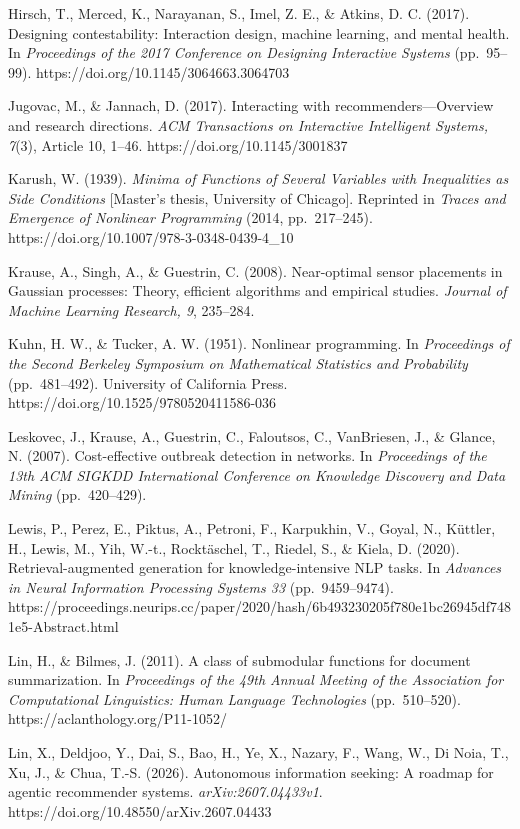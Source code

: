 \documentclass[
  11pt]{article}
\begin{document}
Hirsch, T., Merced, K., Narayanan, S., Imel, Z. E., \& Atkins, D. C.
(2017). Designing contestability: Interaction design, machine learning,
and mental health. In \emph{Proceedings of the 2017 Conference on
Designing Interactive Systems} (pp.~95--99).
https://doi.org/10.1145/3064663.3064703

Jugovac, M., \& Jannach, D. (2017). Interacting with
recommenders---Overview and research directions. \emph{ACM Transactions
on Interactive Intelligent Systems, 7}(3), Article 10, 1--46.
https://doi.org/10.1145/3001837

Karush, W. (1939). \emph{Minima of Functions of Several Variables with
Inequalities as Side Conditions} {[}Master's thesis, University of
Chicago{]}. Reprinted in \emph{Traces and Emergence of Nonlinear
Programming} (2014, pp.~217--245).
https://doi.org/10.1007/978-3-0348-0439-4\_10

Krause, A., Singh, A., \& Guestrin, C. (2008). Near-optimal sensor
placements in Gaussian processes: Theory, efficient algorithms and
empirical studies. \emph{Journal of Machine Learning Research, 9},
235--284.

Kuhn, H. W., \& Tucker, A. W. (1951). Nonlinear programming. In
\emph{Proceedings of the Second Berkeley Symposium on Mathematical
Statistics and Probability} (pp.~481--492). University of California
Press. https://doi.org/10.1525/9780520411586-036

Leskovec, J., Krause, A., Guestrin, C., Faloutsos, C., VanBriesen, J.,
\& Glance, N. (2007). Cost-effective outbreak detection in networks. In
\emph{Proceedings of the 13th ACM SIGKDD International Conference on
Knowledge Discovery and Data Mining} (pp.~420--429).

Lewis, P., Perez, E., Piktus, A., Petroni, F., Karpukhin, V., Goyal, N.,
Küttler, H., Lewis, M., Yih, W.-t., Rocktäschel, T., Riedel, S., \&
Kiela, D. (2020). Retrieval-augmented generation for knowledge-intensive
NLP tasks. In \emph{Advances in Neural Information Processing Systems
33} (pp.~9459--9474).
https://proceedings.neurips.cc/paper/2020/hash/6b493230205f780e1bc26945df7481e5-Abstract.html

Lin, H., \& Bilmes, J. (2011). A class of submodular functions for
document summarization. In \emph{Proceedings of the 49th Annual Meeting
of the Association for Computational Linguistics: Human Language
Technologies} (pp.~510--520). https://aclanthology.org/P11-1052/

Lin, X., Deldjoo, Y., Dai, S., Bao, H., Ye, X., Nazary, F., Wang, W., Di
Noia, T., Xu, J., \& Chua, T.-S. (2026). Autonomous information seeking:
A roadmap for agentic recommender systems. \emph{arXiv:2607.04433v1}.
https://doi.org/10.48550/arXiv.2607.04433
\end{document}
